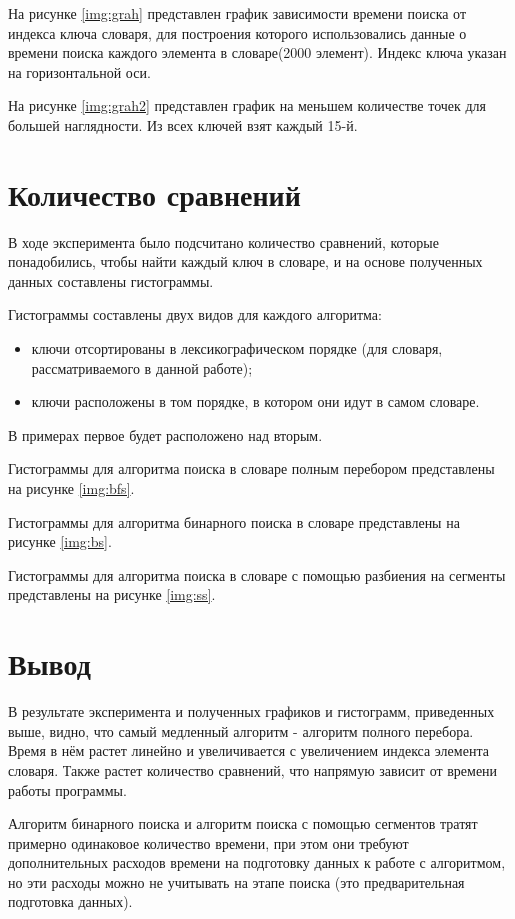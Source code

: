 На рисунке \ref{img:grah} представлен график зависимости времени поиска от
индекса ключа словаря, для построения которого использовались данные
о времени поиска каждого элемента в словаре(2000 элемент). Индекс ключа
указан на горизонтальной оси.


На рисунке \ref{img:grah2} представлен график на меньшем количестве точек для большей наглядности. Из всех ключей взят каждый 15-й.

\newpage

\section{Количество сравнений}
В ходе эксперимента было подсчитано количество сравнений, которые понадобились, чтобы найти каждый ключ в словаре, и на основе полученных данных составлены гистограммы.

Гистограммы составлены двух видов для каждого алгоритма:
\begin{itemize}
	\item ключи отсортированы в лексикографическом порядке (для словаря, рассматриваемого в данной работе);
	\item ключи расположены в том порядке, в котором они идут в самом словаре.	
\end{itemize}

В примерах первое будет расположено над вторым.

Гистограммы для алгоритма поиска в словаре полным перебором представлены на рисунке \ref{img:bfs}.



Гистограммы для алгоритма бинарного поиска в словаре представлены на рисунке \ref{img:bs}.


Гистограммы для алгоритма поиска в словаре с помощью разбиения на сегменты представлены на рисунке \ref{img:ss}.

\clearpage

\section{Вывод}
В результате эксперимента и полученных графиков и гистограмм, приведенных выше, видно, что самый медленный алгоритм - алгоритм полного перебора. Время в нём растет линейно и увеличивается с увеличением индекса элемента словаря. Также растет количество сравнений, что напрямую зависит от времени работы программы.

Алгоритм бинарного поиска и алгоритм поиска с помощью сегментов тратят примерно одинаковое количество времени, при этом они требуют дополнительных расходов времени на $  $подготовку данных к работе с алгоритмом, но эти расходы можно не учитывать на этапе поиска (это предварительная подготовка данных).